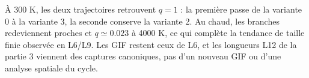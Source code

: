 À 300 K, les deux trajectoires retrouvent $q=1$ : la première passe de la variante 0 à la variante 3, la seconde conserve la variante 2. Au chaud, les branches redeviennent proches et $q\simeq0.023$ à 4000 K, ce qui complète la tendance de taille finie observée en L6/L9. Les GIF restent ceux de L6, et les longueurs L12 de la partie 3 viennent des captures canoniques, pas d’un nouveau GIF ou d’une analyse spatiale du cycle.

